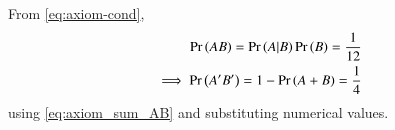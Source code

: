 From \eqref{eq:axiom-cond},
\begin{align}
	{\ensuremath{\Pr\left(AB\right)}}=\Pr\left(A|B\right){\Pr\left(B\right)} = \frac{1}{12}
\\
\implies 
	\Pr\left(A'B'\right)=1-\Pr\left(A+B\right)
	=\frac{1}{4}
\end{align}
using 
\eqref{eq:axiom_sum_AB}
and substituting numerical values.
